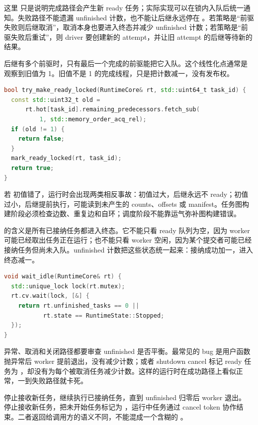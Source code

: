 这里  只是说明完成路径会产生新 ready 任务；实际实现可以在锁内入队后统一通知。失败路径不能遗漏 unfinished 计数，也不能让后继永远停在 。若策略是“前驱失败则后继取消”，取消本身也要进入终态并减少 unfinished 计数；若策略是“前驱失败后重试”，则 driver 要创建新的 attempt，并让旧 attempt 的后继等待新的结果。

后继有多个前驱时，只有最后一个完成的前驱能把它入队。这个线性化点通常是  观察到旧值为 1。旧值不是 1 的完成线程，只是把计数减一，没有发布权。

\begin{lstlisting}[language=C++,caption={后继进入 ready 的原子边界}]
bool try_make_ready_locked(RuntimeCore& rt, std::uint64_t task_id) {
  const std::uint32_t old =
      rt.hot[task_id].remaining_predecessors.fetch_sub(
          1, std::memory_order_acq_rel);
  if (old != 1) {
    return false;
  }
  mark_ready_locked(rt, task_id);
  return true;
}
\end{lstlisting}

若  初值错了，运行时会出现两类相反事故：初值过大，后继永远不 ready；初值过小，后继提前执行，可能读到未产生的 counts、offsets 或 manifest。任务图构建阶段必须检查边数、重复边和自环；调度阶段不能靠运气弥补图构建错误。

 的含义是所有已接纳任务都进入终态。它不能只看 ready 队列为空，因为 worker 可能已经取出任务正在运行；也不能只看 worker 空闲，因为某个提交者可能已经接纳任务但尚未入队。unfinished 计数把这些状态统一起来：接纳成功加一，进入终态减一。

\begin{lstlisting}[language=C++,caption={wait idle 的语义伪代码}]
void wait_idle(RuntimeCore& rt) {
  std::unique_lock lock(rt.mutex);
  rt.cv.wait(lock, [&] {
    return rt.unfinished_tasks == 0 ||
           rt.state == RuntimeState::Stopped;
  });
}
\end{lstlisting}

异常、取消和关闭路径都要审查 unfinished 是否平衡。最常见的 bug 是用户函数抛异常后 worker 提前退出，没有减少计数；或者 shutdown cancel 标记 ready 任务为 ，却没有为每个被取消任务减少计数。这样的运行时在成功路径上看似正常，一到失败路径就卡死。

 停止接收新任务，继续执行已接纳任务，直到 unfinished 归零后 worker 退出。 停止接收新任务，把未开始任务标记为 ，运行中任务通过 cancel token 协作结束。二者返回给调用方的语义不同，不能混成一个含糊的 。

